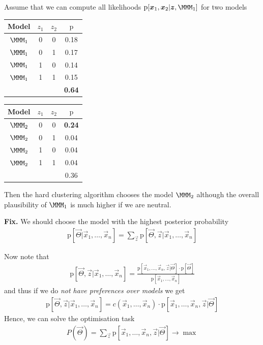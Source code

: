 \documentclass[landscape,footrule]{foils}
\newcommand{\pd}[1]{\mathrm{p}[#1]}
\begin{document}


\enlargethispage{1cm}
Assume that we can compute all likelihoods $\pd{\vec{x}_1,\vec{x}_2|\vec{z},\MMM_1}$ for two models

\begin{center}
\begin{tabular}{cccc}
Model    & $z_1$ & $z_2$ & $\mathrm{p}$\\
\hline
$\MMM_1$ & 0 & 0 & 0.18\\
$\MMM_1$ & 0 & 1 & 0.17\\
$\MMM_1$ & 1 & 0 & 0.14\\
$\MMM_1$ & 1 & 1 & 0.15\\
\hline
&&& \textbf{0.64}
\end{tabular}\hspace*{2cm}
\begin{tabular}{cccc}
Model    & $z_1$ & $z_2$ & $\mathrm{p}$\\
\hline
$\MMM_2$ & 0 & 0 & \textbf{0.24}\\
$\MMM_2$ & 0 & 1 & 0.04\\
$\MMM_2$ & 1 & 0 & 0.04\\
$\MMM_2$ & 1 & 1 & 0.04\\
\hline
&&& 0.36
\end{tabular}
\end{center}
Then the hard clustering algorithm chooses the model $\MMM_2$ although the overall plausibility of $\MMM_1$ is much higher if we are neutral. 

\textbf{Fix.} We should choose the model with the highest posterior probability
\begin{align*}
\pd{\vec{\Theta}|\vec{x}_1,\ldots,\vec{x}_n}=\sum_{\vec{z}}\pd{\vec{\Theta},\vec{z}|\vec{x}_1,\ldots,\vec{x}_n}
\end{align*}


Now note that 
\begin{align*}
\pd{\vec{\Theta},\vec{z}|\vec{x}_1,\ldots,\vec{x}_n}=\frac{\pd{\vec{x}_1,\ldots,\vec{x}_n,\vec{z}|\vec{\Theta}} \cdot\pd{\vec{\Theta}}}{\pd{\vec{x}_1,\ldots,\vec{x}_n}}
\end{align*}
and thus if we do \emph{not have preferences over models} we get 
\begin{align*}
\pd{\vec{\Theta},\vec{z}|\vec{x}_1,\ldots,\vec{x}_n}=c(\vec{x}_1,\ldots,\vec{x}_n)\cdot\pd{\vec{x}_1,\ldots,\vec{x}_n,\vec{z}|\vec{\Theta}} 
\end{align*}
Hence, we can solve the optimisation task
\begin{align*}
P(\vec{\Theta})=\sum_{\vec{z}}\pd{\vec{x}_1,\ldots,\vec{x}_n,\vec{z}|\vec{\Theta}}\to\max 
\end{align*}
\end{document}
